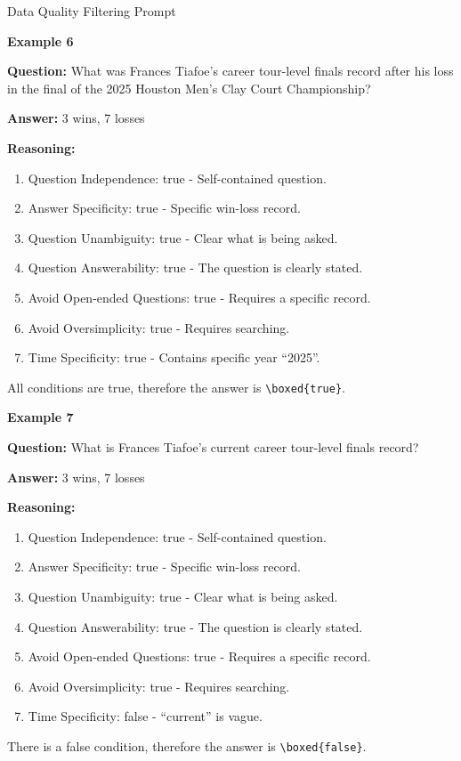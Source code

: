 \documentclass{article} %
\theoremstyle{plain}
\theoremstyle{definition}
\theoremstyle{remark}
\begin{document}
\begin{promptbox}{Data Quality Filtering Prompt}
\noindent\hrulefill

\textbf{Example 6}

\textbf{Question:} What was Frances Tiafoe's career tour-level finals record after his loss in the final of the 2025 Houston Men's Clay Court Championship?

\textbf{Answer:} 3 wins, 7 losses

\textbf{Reasoning:}
\begin{enumerate}[label=\arabic*.]
    \item Question Independence: true - Self-contained question.
    \item Answer Specificity: true - Specific win-loss record.
    \item Question Unambiguity: true - Clear what is being asked.
    \item Question Answerability: true - The question is clearly stated.
    \item Avoid Open-ended Questions: true - Requires a specific record.
    \item Avoid Oversimplicity: true - Requires searching.
    \item Time Specificity: true - Contains specific year ``2025''.
\end{enumerate}
All conditions are true, therefore the answer is \texttt{\textbackslash boxed\{true\}}.

\noindent\hrulefill

\textbf{Example 7}

\textbf{Question:} What is Frances Tiafoe's current career tour-level finals record?

\textbf{Answer:} 3 wins, 7 losses

\textbf{Reasoning:}
\begin{enumerate}[label=\arabic*.]
    \item Question Independence: true - Self-contained question.
    \item Answer Specificity: true - Specific win-loss record.
    \item Question Unambiguity: true - Clear what is being asked.
    \item Question Answerability: true - The question is clearly stated.
    \item Avoid Open-ended Questions: true - Requires a specific record.
    \item Avoid Oversimplicity: true - Requires searching.
    \item Time Specificity: false - ``current'' is vague.
\end{enumerate}
There is a false condition, therefore the answer is \texttt{\textbackslash boxed\{false\}}.


\end{promptbox}
\end{document}
